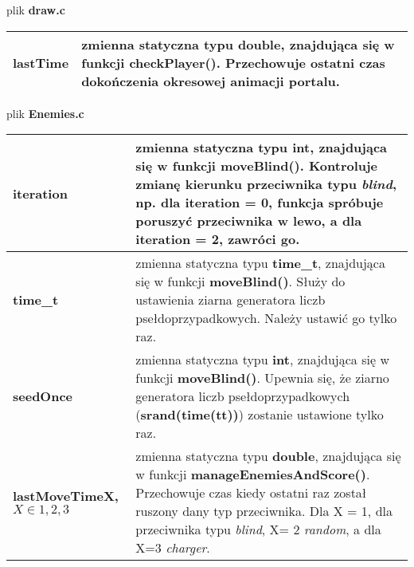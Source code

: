 \documentclass[12pt,a4paper]{article}
\begin{document}

{\Large plik \textbf{draw.c}}
\begin{center}
\begin{tabularx}{\linewidth}{ |l|X| } 

\hline
\textbf{lastTime}&
zmienna statyczna typu \textbf{double}, znajdująca się w funkcji \textbf{checkPlayer()}. Przechowuje ostatni czas dokończenia okresowej animacji portalu.\\

\hline
\end{tabularx}
\end{center}



\newpage
{\Large plik \textbf{Enemies.c}}
\begin{center}
\begin{tabularx}{\linewidth}{ |l|X| } 

\hline
\textbf{iteration}&
zmienna statyczna typu \textbf{int}, znajdująca się w funkcji \textbf{moveBlind()}. Kontroluje zmianę kierunku przeciwnika typu \emph{blind}, np. dla \textbf{iteration = 0}, funkcja spróbuje poruszyć przeciwnika w lewo, a dla \textbf{iteration = 2}, zawróci go.\\

\hline
\textbf{time\_t}&
zmienna statyczna typu \textbf{time\_t}, znajdująca się w funkcji \textbf{moveBlind()}. Służy do ustawienia ziarna generatora liczb psełdoprzypadkowych. Należy ustawić go tylko raz.\\

\hline
\textbf{seedOnce}&
zmienna statyczna typu \textbf{int}, znajdująca się w funkcji \textbf{moveBlind()}. Upewnia się, że ziarno generatora liczb psełdoprzypadkowych (\textbf{srand(time(tt))}) zostanie ustawione tylko raz.\\

\hline 
\textbf{lastMoveTimeX, $X \in {1,2,3}$} &
zmienna statyczna typu \textbf{double}, znajdująca się w funkcji \textbf{manageEnemiesAndScore()}. Przechowuje czas  kiedy ostatni raz został ruszony dany typ przeciwnika. Dla X = 1, dla przeciwnika typu \emph{blind}, X= 2 \emph{random}, a dla X=3 \emph{charger}.\\

\hline
\end{tabularx}
\end{center}


\end{document}
